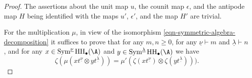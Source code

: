 \documentclass[12pt,a4paper,reqno]{amsart}
\DeclareMathOperator{\hochhom}{{HH}}
\DeclareMathOperator\Sym{Sym}
\begin{document}
\begin{proof}
The assertions about the unit map $u$, the counit map $\epsilon$, 
and the antipode map $H$ being identified with the maps $u'$,
$\epsilon'$, and the map $H'$ are trivial. 

For the multiplication $\mu$, in view of the isomorphism 
\eqref{eqn-symmetric-algebra-decomposition} it suffices to prove that
for any $m,n \geq 0$, for any $\underline{\nu} \vdash m$ and 
$\underline{\lambda} \vdash n$, and for any $x \in \Sym^{\underline{\nu}}
\hochhom_\bullet(\A)$ and $y \in \Sym^{\underline{\lambda}} \hochhom_\bullet(\A)$
we have 
\begin{equation}
\label{eqn-verification-of-multiplication-structures-coinciding}
\zeta(\mu(x t^{\underline{\nu}} \otimes y t^{\underline{\lambda}})) = 
\mu'(\zeta(x t^{\underline{\nu}}) \otimes \zeta (y t^{\underline{\lambda}}))). 
\end{equation}


\end{proof}
\end{document}
